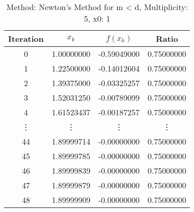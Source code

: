 \begin{table}
\centering
\caption{Method: Newton's Method for m < d, Multiplicity: 5, x0: 1}
\label{tab:table_Newton's_Method_for_m_<_d_5_1}
\begin{tabular}{c c c c}
\toprule
Iteration &      $x_k$ &    $f(x_k)$ &      Ratio \\
\midrule
        0 & 1.00000000 & -0.59049000 & 0.75000000 \\
        1 & 1.22500000 & -0.14012604 & 0.75000000 \\
        2 & 1.39375000 & -0.03325257 & 0.75000000 \\
        3 & 1.52031250 & -0.00789099 & 0.75000000 \\
        4 & 1.61523437 & -0.00187257 & 0.75000000 \\
   \vdots &     \vdots &      \vdots &     \vdots \\
       44 & 1.89999714 & -0.00000000 & 0.75000000 \\
       45 & 1.89999785 & -0.00000000 & 0.75000000 \\
       46 & 1.89999839 & -0.00000000 & 0.75000000 \\
       47 & 1.89999879 & -0.00000000 & 0.75000000 \\
       48 & 1.89999909 & -0.00000000 & 0.75000000 \\
\bottomrule
\end{tabular}
\end{table}
